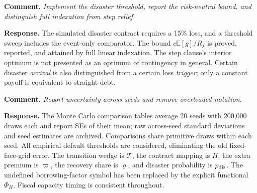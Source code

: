 \documentclass[11pt]{article}
\newcommand{\comment}[1]{\par\medskip\Needspace{7\baselineskip}\noindent\textbf{Comment.} \emph{#1}\par\smallskip}
\newcommand{\response}{\noindent\textbf{Response.} }
\begin{document}
\comment{Implement the disaster threshold, report the risk-neutral bound, and distinguish full indexation from step relief.}
\response The simulated disaster contract requires a 15\% loss, and a threshold sweep includes the event-only comparator. The bound $c\mathbb E[g]/R_f$ is proved, reported, and attained by full linear indexation. The step clause's interior optimum is not presented as an optimum of contingency in general. Certain disaster \emph{arrival} is also distinguished from a certain loss \emph{trigger}; only a constant payoff is equivalent to straight debt.

\comment{Report uncertainty across seeds and remove overloaded notation.}
\response The Monte Carlo comparison tables average 20 seeds with 200,000 draws each and report SEs of their mean; raw across-seed standard deviations and seed estimates are archived. Comparisons share primitive draws within each seed. All empirical default thresholds are considered, eliminating the old fixed-face-grid error. The transition wedge is $\mathcal T$, the contract mapping is $H$, the extra premium is $\varpi$, the recovery share is $\varrho$, and disaster probability is $p_{\rm dis}$. The undefined borrowing-factor symbol has been replaced by the explicit functional $\Phi_H$. Fiscal capacity timing is consistent throughout.
\end{document}
